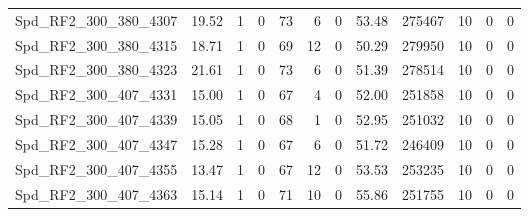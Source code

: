 \begin{longtable}[c]{@{}lrrrrrrrrrrr@{}}
Spd\_RF2\_300\_380\_4307      & 19.52                  & 1                       & 0                       & 73                     & 6                       & 0                       & 53.48                   & 275467                   & 10                       & 0                        & 0                        \\
Spd\_RF2\_300\_380\_4315      & 18.71                  & 1                       & 0                       & 69                     & 12                      & 0                       & 50.29                   & 279950                   & 10                       & 0                        & 0                        \\
Spd\_RF2\_300\_380\_4323      & 21.61                  & 1                       & 0                       & 73                     & 6                       & 0                       & 51.39                   & 278514                   & 10                       & 0                        & 0                        \\
Spd\_RF2\_300\_407\_4331      & 15.00                  & 1                       & 0                       & 67                     & 4                       & 0                       & 52.00                   & 251858                   & 10                       & 0                        & 0                        \\
Spd\_RF2\_300\_407\_4339      & 15.05                  & 1                       & 0                       & 68                     & 1                       & 0                       & 52.95                   & 251032                   & 10                       & 0                        & 0                        \\
Spd\_RF2\_300\_407\_4347      & 15.28                  & 1                       & 0                       & 67                     & 6                       & 0                       & 51.72                   & 246409                   & 10                       & 0                        & 0                        \\
Spd\_RF2\_300\_407\_4355      & 13.47                  & 1                       & 0                       & 67                     & 12                      & 0                       & 53.53                   & 253235                   & 10                       & 0                        & 0                        \\
Spd\_RF2\_300\_407\_4363      & 15.14                  & 1                       & 0                       & 71                     & 10                      & 0                       & 55.86                   & 251755                   & 10                       & 0                        & 0                        \\

\end{longtable}
